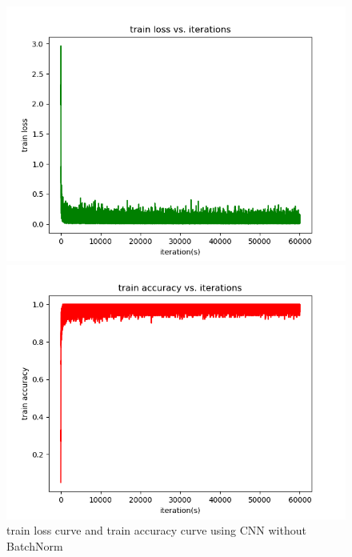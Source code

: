 \documentclass{elegantbook}
\begin{document}
\begin{figure}[!h]
	\centering
	\begin{minipage}[t]{0.48\textwidth}
		\centering
		\includegraphics[width=\textwidth]{../results/trainloss22}
	\end{minipage}
	\begin{minipage}[t]{0.48\textwidth}
		\centering
		\includegraphics[width=\textwidth]{../results/trainacc22}
	\end{minipage}
	\caption{\label{trainres22}train loss curve and train accuracy curve using CNN without BatchNorm}
\end{figure}
\end{document}
